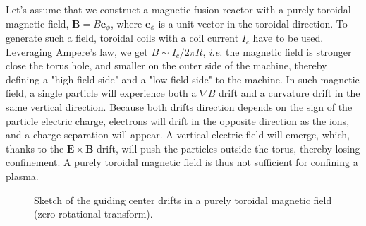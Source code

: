\documentclass[my_thesis.tex]{subfiles}
\begin{document}
Let's assume that we construct a magnetic fusion reactor with a purely toroidal magnetic field, $\mathbf{B}= B\mathbf{e}_\phi$, where $\mathbf{e}_\phi$ is a unit vector in the toroidal direction. To generate such a field, toroidal coils with a coil current $I_c$ have to be used. Leveraging Ampere's law, we get $B \sim I_c / 2\pi R$, \textit{i.e.} the magnetic field is stronger close the torus hole, and smaller on the outer side of the machine, thereby defining a "high-field side" and a "low-field side" to the machine. In such magnetic field, a single particle will experience both a $\nabla B$ drift and a curvature drift in the same vertical direction. Because both drifts direction depends on the sign of the particle electric charge, electrons will drift in the opposite direction as the ions, and a charge separation will appear. A vertical electric field will emerge, which, thanks to the $\mathbf{E}\times\mathbf{B}$ drift, will push the particles outside the torus, thereby losing confinement. A purely toroidal magnetic field is thus not sufficient for confining a plasma.

\begin{figure}
    \centering
    \caption{Sketch of the guiding center drifts in a purely toroidal magnetic field (zero rotational transform).}
\end{figure}
\end{document}
